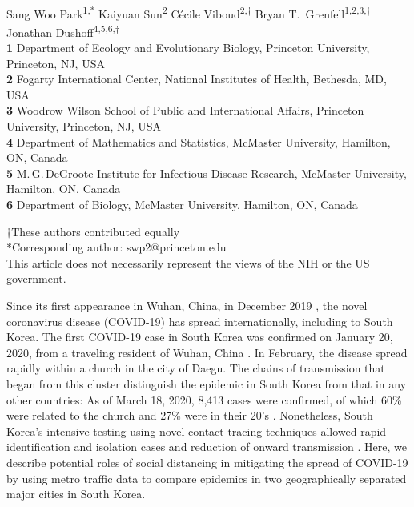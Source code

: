 \documentclass[12pt]{article}
\date{\today}
\begin{document}
\begin{flushleft}{
	\Large
	\textbf{}
}
\newline
\\
Sang Woo Park\textsuperscript{1,*}
Kaiyuan Sun\textsuperscript{2}
C\'ecile Viboud\textsuperscript{2,$\dagger$}
Bryan T.\ Grenfell\textsuperscript{1,2,3,$\dagger$}
Jonathan Dushoff\textsuperscript{4,5,6,$\dagger$}
\\
\bigskip
\textbf{1} Department of Ecology and Evolutionary Biology, Princeton University, Princeton, NJ, USA
\\
\textbf{2} Fogarty International Center, National Institutes of Health, Bethesda, MD, USA
\\
\textbf{3} Woodrow Wilson School of Public and International Affairs, Princeton University, Princeton, NJ, USA
\\
\textbf{4} Department of Mathematics and Statistics, McMaster University, Hamilton, ON, Canada
\\
\textbf{5} M.\,G.\,DeGroote Institute for Infectious Disease Research, McMaster University, Hamilton, ON, Canada
\\
\textbf{6} Department of Biology, McMaster University, Hamilton, ON, Canada
\\
\bigskip

$\dagger$These authors contributed equally\\
*Corresponding author: swp2@princeton.edu\\
This article does not necessarily represent the views of the NIH or the US government.
\end{flushleft}

\pagebreak

Since its first appearance in Wuhan, China, in December 2019 \citep{pneumonia}, the novel coronavirus disease (COVID-19) has spread internationally, including to South Korea.
The first COVID-19 case in South Korea was confirmed on January 20, 2020, from a traveling resident of Wuhan, China \citep{kcdc}.
In February, the disease spread rapidly within a church in the city of Daegu.
The chains of transmission that began from this cluster distinguish the epidemic in South Korea from that in any other countries:
As of March 18, 2020, 8,413 cases were confirmed, of which 60\% were related to the church and 27\% were in their 20's \citep{kcdc}.
Nonetheless, South Korea's intensive testing using novel contact tracing techniques allowed rapid identification and isolation cases and reduction of onward transmission \citep{fergusonimpact, tracingkorea, science}.
Here, we describe potential roles of social distancing in mitigating the spread of COVID-19 by using metro traffic data to compare epidemics in two geographically separated major cities in South Korea.
\end{document}
